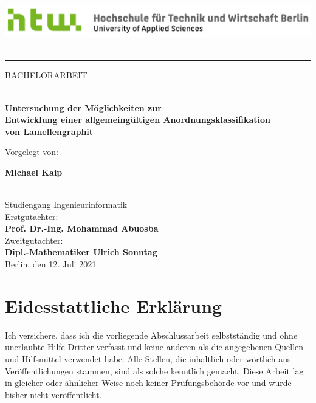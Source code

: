 \documentclass[
fontsize=10pt, 
listof = totoc,
parskip = half	
]{report}
\author{Michael Kaip}
\date{}
\begin{document}
\begin{titlepage}
	\vspace*{-\headsep}\vspace{-\headheight}
	\noindent
	\includegraphics[scale=0.38]{logo}
	\hfill
	\textcolor{white}{placeholder}\\[-1ex]
	\rule{\linewidth}{1pt}
	
	\vfill\vfill
	
	\begin{center}
		BACHELORARBEIT
		\begin{huge}
			\\[2ex]
			\textbf{Untersuchung der Möglichkeiten zur \\ Entwicklung einer allgemeingültigen Anordnungsklassifikation \\ von Lamellengraphit}
			\\[6ex]
		\end{huge}
		Vorgelegt von:
		\\[2ex]
		\begin{huge}
			\textbf{Michael Kaip}
		\end{huge}
		\\[2ex]
		Studiengang Ingenieurinformatik
		\\[28ex]
		Erstgutachter:
		\\[2ex]
		\textbf{Prof. Dr.-Ing. Mohammad Abuosba}
		\\[4ex]
		Zweitgutachter:
		\\[2ex]
		\textbf{Dipl.-Mathematiker Ulrich Sonntag}
		\\[40ex]
		Berlin, den 12. Juli 2021
	\end{center}
\end{titlepage}
	
\clearpage

\begingroup
\pagestyle{empty}
\null
\newpage
\endgroup


\chapter*{\centering Eidesstattliche Erklärung}

Ich versichere, dass ich die vorliegende Abschlussarbeit selbstständig und ohne unerlaubte Hilfe Dritter verfasst und keine anderen als die angegebenen Quellen und Hilfsmittel verwendet habe. Alle Stellen, die inhaltlich oder wörtlich aus Veröffentlichungen stammen, sind als solche kenntlich gemacht. Diese Arbeit lag in gleicher oder ähnlicher Weise noch keiner Prüfungsbehörde vor und wurde bisher nicht veröffentlicht.
\end{document}
